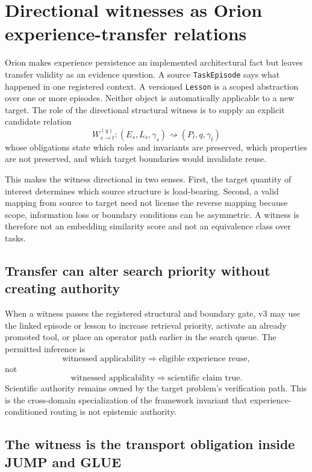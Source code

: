 \section{Directional witnesses as Orion experience-transfer relations}
\label{sec:v3-transfer}

Orion makes experience persistence an implemented architectural fact but leaves transfer validity as an evidence question. A source \texttt{TaskEpisode} says what happened in one registered context. A versioned \texttt{Lesson} is a scoped abstraction over one or more episodes. Neither object is automatically applicable to a new target. The role of the directional structural witness is to supply an explicit candidate relation
\[
W_{s\rightarrow t}^{(q)}:
(E_s,L_s,\gamma_s)
\rightsquigarrow
(P_t,q,\gamma_t)
\]
whose obligations state which roles and invariants are preserved, which properties are not preserved, and which target boundaries would invalidate reuse.

This makes the witness directional in two senses. First, the target quantity of interest determines which source structure is load-bearing. Second, a valid mapping from source to target need not license the reverse mapping because scope, information loss or boundary conditions can be asymmetric. A witness is therefore not an embedding similarity score and not an equivalence class over tasks.

\subsection{Transfer can alter search priority without creating authority}
When a witness passes the registered structural and boundary gate, v3 may use the linked episode or lesson to increase retrieval priority, activate an already promoted tool, or place an operator path earlier in the search queue. The permitted inference is
\[
\text{witnessed applicability}
\Rightarrow
\text{eligible experience reuse},
\]
not
\[
\text{witnessed applicability}
\Rightarrow
\text{scientific claim true}.
\]
Scientific authority remains owned by the target problem's verification path. This is the cross-domain specialization of the framework invariant that experience-conditioned routing is not epistemic authority.

\subsection{The witness is the transport obligation inside JUMP and GLUE}

